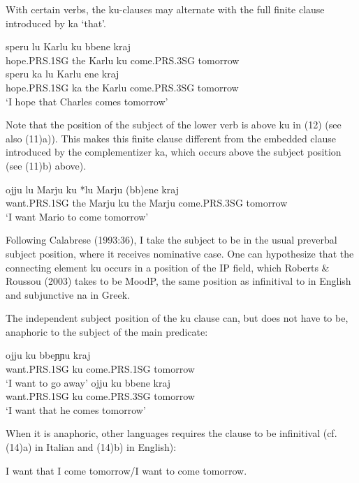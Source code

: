 \documentclass[output=paper,colorlinks,citecolor=brown,
]{langscibook}
\begin{document}
With certain verbs, the ku-clauses may alternate with the full finite clause introduced by ka ‘that’. 

\ea
    \ea \gll speru   lu  Karlu   ku  bbene      kraj \\
       hope.PRS.1SG    the  Karlu   ku  come.PRS.3SG  tomorrow\\
    \ex \gll speru       ka   lu  Karlu ene       kraj \\
     hope.PRS.1SG    ka   the  Karlu  come.PRS.3SG  tomorrow\\
   \glt ‘I hope that Charles comes tomorrow’
    \z
\z

Note that the position of the subject of the lower verb is above ku in (12) (see also (11)a)). This makes this finite clause different from the embedded clause introduced by the complementizer ka, which occurs above the subject position (see (11)b) above). 

\ea
\gll ojju   {lu Marju} ku {*lu Marju} (bb)ene  kraj \\
 want.PRS.1SG {the Marju} ku {the Marju}  come.PRS.3SG tomorrow\\
\glt ‘I want Mario to come tomorrow’
\z

Following Calabrese (1993:36), I take the subject to be in the usual preverbal subject position, where it receives nominative case.  One can hypothesize that the connecting element ku occurs in a position of the IP field, which Roberts \& Roussou (2003) takes to be MoodP, the same position as infinitival to in English and subjunctive na in Greek.

The independent subject position of the ku clause can, but does not have to be, anaphoric to the subject of the main predicate:

\ea
    \ea
        \gll ojju          ku   bbeɲɲu      kraj\\
   want.PRS.1SG   ku    come.PRS.1SG  tomorrow\\
    \glt   ‘I want to go away’
    \ex
        \gll ojju          ku   bbene       kraj \\
   want.PRS.1SG   ku   come.PRS.3SG  tomorrow\\
    \glt ‘I want that he comes tomorrow’
    \z
\z

When it is anaphoric, other languages requires the clause to be infinitival (cf. (14)a) in Italian and (14)b) in English):

\ea
    \ex *I want that I come tomorrow/I want to come tomorrow.
    \z
\z
\end{document}
